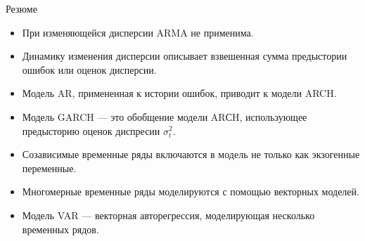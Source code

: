 \begin{frame}{Резюме}
\begin{itemize}
    \item При изменяющейся дисперсии ARMA не применима.
    \item Динамику изменения дисперсии описывает взвешенная сумма предыстории ошибок или оценок дисперсии.
    \item Модель AR, примененная к истории ошибок, приводит к модели ARCH.
    \item Модель GARCH --- это обобщение модели ARСH, использующее предысторию оценок диспресии $\sigma_t^2$.
    \item Созависимые временные ряды включаются в модель не только как экзогенные переменные.
    \item Многомерные временные ряды моделируются с помощью векторных моделей.
    \item Модель VAR --- векторная авторегрессия, моделирующая несколько временных рядов.
\end{itemize}
\end{frame}

 